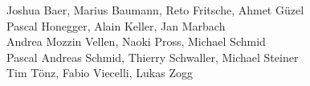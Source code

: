 %
%
%

Joshua Baer,                      %
Marius Baumann,                   %
Reto Fritsche,                    %
Ahmet Güzel%
\\
Pascal Honegger,                  %
Alain Keller,                     %
Jan Marbach%
\\
Andrea Mozzin Vellen,             %
Naoki Pross,                      %
Michael Schmid                    %
\\
Pascal Andreas Schmid,            %
Thierry Schwaller,                %
Michael Steiner%
\\
Tim Tönz,                         %
Fabio Viecelli,                   %
Lukas Zogg%
